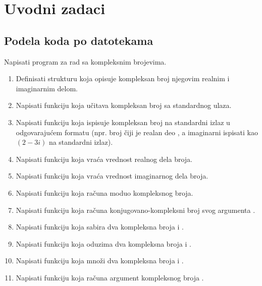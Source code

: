 \chapter{Uvodni zadaci}

\section{Podela koda po datotekama}

\begin{Exercise}[label=001] %
Napisati program za rad sa kompleksnim brojevima.
\begin{enumerate}
\item Definisati strukturu  koja opisuje kompleksan broj njegovim realnim i imaginarnim delom.
\item Napisati funkciju  koja učitava kompleksan broj sa standardnog ulaza.
\item Napisati funkciju  koja ispisuje kompleksan broj na standardni izlaz u odgovarajućem formatu (npr. broj čiji je realan deo , a imaginarni  ispisati kao $(2 - 3 i)$ na standardni izlaz).
\item Napisati funkciju  koja vraća vrednost realnog dela broja.
\item Napisati funkciju  koja vraća vrednost imaginarnog dela broja.
\item Napisati funkciju  koja računa moduo kompleksnog broja.
\item Napisati funkciju  koja računa konjugovano-kompleksni broj svog argumenta .
\item Napisati funkciju  koja sabira dva kompleksna broja  i .
\item Napisati funkciju  koja oduzima dva kompleksna broja  i .
\item Napisati funkciju  koja množi dva kompleksna broja  i .
\item Napisati funkciju  koja računa argument kompleksnog broja .
\end{enumerate}


\end{Exercise}
